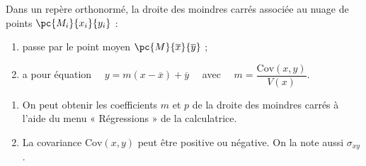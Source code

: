 \documentclass[a4paper,11pt,cours]{nsi} %
\begin{document}
\begin{propriete}[ (admise)]
    Dans un repère orthonormé, la droite des moindres carrés associée au nuage de points $\pc{M_i}{x_i}{y_i}$ :
    \begin{enumerate}[label=\textbullet]
        \item passe par le point moyen $\pc{M}{\overline{x}}{\overline{y}}$ ;
        \item a pour équation $\quad y=m(x-\overline{x})+\overline{y}\quad$ avec $\quad m=\dfrac{\mathrm{Cov}(x,y)}{V(x)}$.
    \end{enumerate}
\end{propriete}

\begin{remarque}[s]
    \begin{enumerate}[label=\textbullet]
        \item On peut obtenir les coefficients $m$ et $p$ de la droite des moindres carrés à l'aide du menu « Régressions » de la calculatrice.
        \item La covariance $\mathrm{Cov}(x,y)$ peut être positive ou négative. On la note aussi $\sigma_{xy}$.
    \end{enumerate}
\end{remarque}
\end{document}
